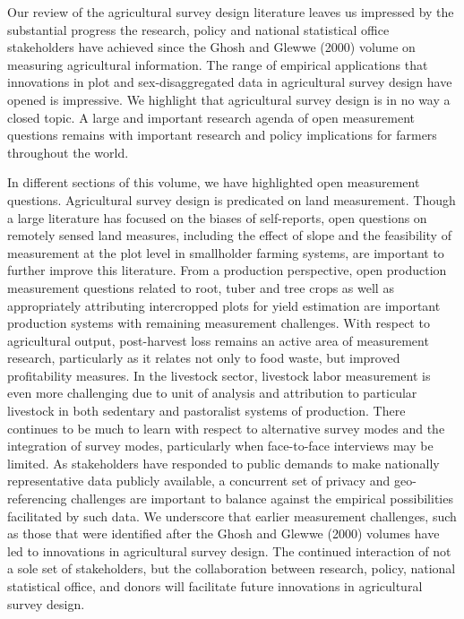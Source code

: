 \documentclass[
]{book}
\begin{document}
Our review of the agricultural survey design literature leaves us impressed by the substantial progress the research, policy and national statistical office stakeholders have achieved since the Ghosh and Glewwe (2000) volume on measuring agricultural information. The range of empirical applications that innovations in plot and sex-disaggregated data in agricultural survey design have opened is impressive. We highlight that agricultural survey design is in no way a closed topic. A large and important research agenda of open measurement questions remains with important research and policy implications for farmers throughout the world.

In different sections of this volume, we have highlighted open measurement questions. Agricultural survey design is predicated on land measurement. Though a large literature has focused on the biases of self-reports, open questions on remotely sensed land measures, including the effect of slope and the feasibility of measurement at the plot level in smallholder farming systems, are important to further improve this literature. From a production perspective, open production measurement questions related to root, tuber and tree crops as well as appropriately attributing intercropped plots for yield estimation are important production systems with remaining measurement challenges. With respect to agricultural output, post-harvest loss remains an active area of measurement research, particularly as it relates not only to food waste, but improved profitability measures. In the livestock sector, livestock labor measurement is even more challenging due to unit of analysis and attribution to particular livestock in both sedentary and pastoralist systems of production. There continues to be much to learn with respect to alternative survey modes and the integration of survey modes, particularly when face-to-face interviews may be limited. As stakeholders have responded to public demands to make nationally representative data publicly available, a concurrent set of privacy and geo-referencing challenges are important to balance against the empirical possibilities facilitated by such data. We underscore that earlier measurement challenges, such as those that were identified after the Ghosh and Glewwe (2000) volumes have led to innovations in agricultural survey design. The continued interaction of not a sole set of stakeholders, but the collaboration between research, policy, national statistical office, and donors will facilitate future innovations in agricultural survey design.
\end{document}
